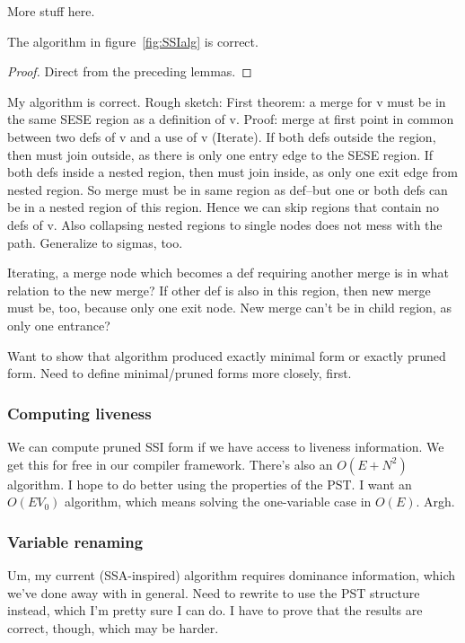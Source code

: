 \documentclass[12pt,titlepage]{article}
\begin{document}
More stuff here.

\begin{theorem}
The algorithm in figure~\ref{fig:SSIalg} is correct.
\end{theorem}
\begin{proof}
Direct from the preceding lemmas.
\end{proof}

My algorithm is correct.
Rough sketch:
First theorem: a merge for v must be in the same SESE region as a
definition of v.
Proof: merge at first point in common between two defs of v and a use
of v (Iterate). If both defs outside the region, then must join
outside, as there is only one entry edge to the SESE region.  If both
defs inside a nested region, then must join inside, as only one exit
edge from nested region.  So merge must be in same region as def--but
one or both defs can be in a nested region of this region.  Hence we
can skip regions that contain no defs of v. Also collapsing nested
regions to single nodes does not mess with the path.  Generalize to
sigmas, too.

Iterating, a merge node which becomes a def requiring another merge is
in what relation to the new merge?  If other def is also in this
region, then new merge must be, too, because only one exit node.
New merge can't be in child region, as only one entrance?

Want to show that algorithm produced exactly minimal form or exactly
pruned form.  Need to define minimal/pruned forms more closely, first.

\subsubsection{Computing liveness}
We can compute pruned SSI form if we have access to liveness
information.
We get this for free in our compiler framework.  There's also an
$O(E+N^2)$ algorithm.  I hope to do better using the properties of the
PST.  I want an $O(E V_0)$ algorithm, which means solving the
one-variable case in $O(E)$.  Argh.

\subsubsection{Variable renaming}
Um, my current (SSA-inspired) algorithm requires dominance
information, which we've done away with in general.  Need to rewrite
to use the PST structure instead, which I'm pretty sure I can do.
I have to prove that the results are correct, though, which may be harder.%
\end{document}
